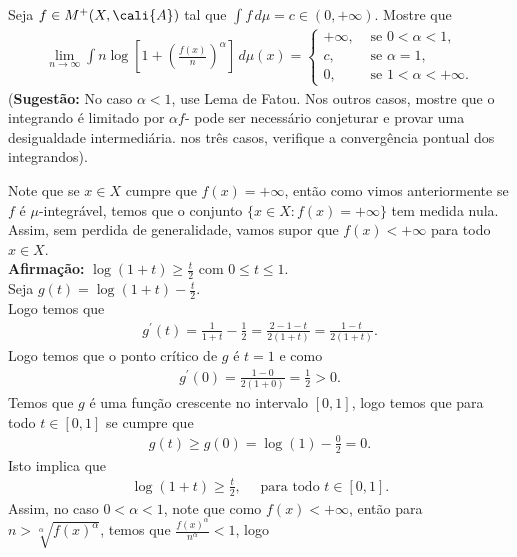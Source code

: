 \begin{homeworkProblem}[7]
  Seja $f\in M^{+}(X,\cali{A})$ tal que $\int f\,d\mu=c\in(0,+\infty)$. Mostre que
  \begin{align*}
    \lim_{n \to \infty}\int n\log\left[ 1+\left( \frac{f(x)}{n} \right)^{\alpha} \right]\,d\mu(x)=\begin{cases}
      +\infty, &\text{ se } 0<\alpha<1 \text{,} \\
      c, &\text{ se } \alpha=1,\\
      0, &\text{ se } 1<\alpha<+\infty.
    \end{cases}
  \end{align*}
  (\textbf{Sugestão:} No caso $\alpha<1$, use Lema de Fatou. Nos outros casos, mostre que o integrando é limitado por $\alpha f$- pode ser necessário conjeturar e provar uma desigualdade intermediária. nos três casos, verifique a convergência pontual dos integrandos).
  \begin{solution}
    Note que se $x\in X$ cumpre que $f(x)=+\infty$, então como vimos anteriormente se $f$ é $\mu$-integrável, temos que o conjunto $\{x\in X:f(x)=+\infty\}$ tem medida nula.\\
    Assim, sem perdida de generalidade, vamos supor que $f(x)<+\infty$ para todo $x\in X$.\\
    \textbf{Afirmação:} $\log(1+t)\geq \frac{t}{2}$ com $0\leq t\leq 1$.\\
    Seja $g(t)=\log(1+t)-\frac{t}{2}$.\\
    Logo temos que 
    \begin{align*}
      g^{\prime}(t)=\frac{1}{1+t}-\frac{1}{2}=\frac{2-1-t}{2(1+t)}=\frac{1-t}{2(1+t)}.
    \end{align*}
    Logo temos que o ponto crítico de $g$ é $t=1$ e como
    \begin{align*}
      g^{\prime}(0)=\frac{1-0}{2(1+0)}=\frac{1}{2}>0.
    \end{align*}
    Temos que $g$ é uma função crescente no intervalo $[0,1]$, logo temos que para todo $t\in[0,1]$ se cumpre que 
    \begin{align*}
      g(t)\geq g(0)=\log(1)-\frac{0}{2}=0.
    \end{align*}
    Isto implica que
    \begin{align*}
      \log(1+t)\geq \frac{t}{2},\quad\text{ para todo }t\in[0,1].
    \end{align*}
    Assim, no caso $0<\alpha<1$, note que como $f(x)<+\infty$, então para $n>\sqrt[\alpha]{f(x)^{\alpha}}$, temos que $\frac{f(x)^{\alpha}}{n^{\alpha}}<1$, logo 

\end{solution}
\end{homeworkProblem}
